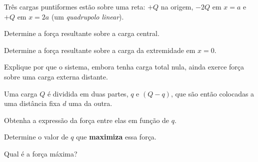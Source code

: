 \begin{questao}[3]{}

Três cargas puntiformes estão sobre uma reta: $+Q$ na origem, $-2Q$ em $x=a$ e
$+Q$ em $x=2a$ (um \emph{quadrupolo linear}).
\begin{itensq}
\item Determine a força resultante sobre a carga central.
\item Determine a força resultante sobre a carga da extremidade em $x=0$.
\item Explique por que o sistema, embora tenha carga total nula, ainda exerce
      força sobre uma carga externa distante.
\end{itensq}


\end{questao}

\blocodesafio
\begin{questao}[4]{}

Uma carga $Q$ é dividida em duas partes, $q$ e $(Q-q)$, que são então colocadas a
uma distância fixa $d$ uma da outra.
\begin{itensq}
\item Obtenha a expressão da força entre elas em função de $q$.
\item Determine o valor de $q$ que \textbf{maximiza} essa força.
\item Qual é a força máxima?
\end{itensq}


\end{questao}

